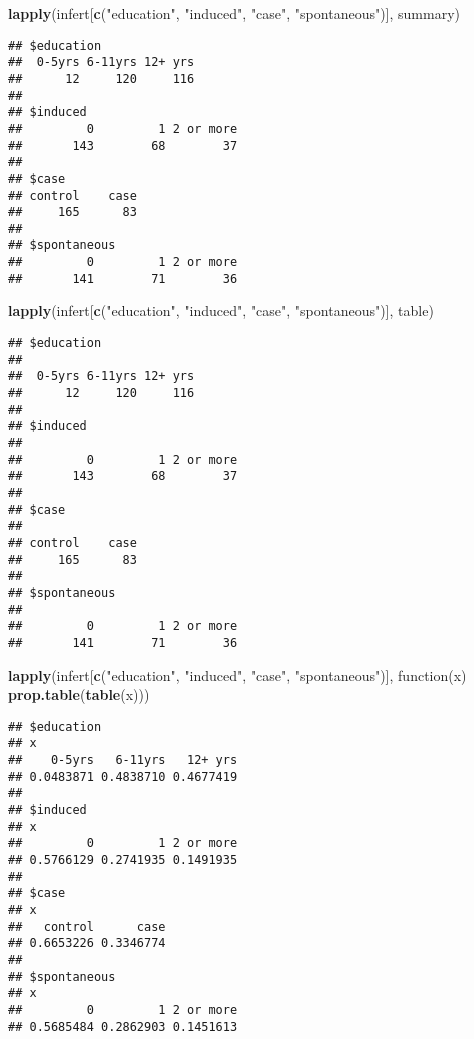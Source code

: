 \documentclass[]{book}
\newenvironment{Shaded}{\begin{snugshade}}{\end{snugshade}}
\newcommand{\KeywordTok}[1]{\textcolor[rgb]{0.13,0.29,0.53}{\textbf{{#1}}}}
\newcommand{\StringTok}[1]{\textcolor[rgb]{0.31,0.60,0.02}{{#1}}}
\newcommand{\NormalTok}[1]{{#1}}
\theoremstyle{definition}
\theoremstyle{definition}
\theoremstyle{remark}
\begin{document}
\begin{Shaded}
\begin{Highlighting}[]
\KeywordTok{lapply}\NormalTok{(infert[}\KeywordTok{c}\NormalTok{(}\StringTok{"education"}\NormalTok{, }\StringTok{"induced"}\NormalTok{, }\StringTok{"case"}\NormalTok{, }\StringTok{"spontaneous"}\NormalTok{)], summary)}
\end{Highlighting}
\end{Shaded}

\begin{verbatim}
## $education
##  0-5yrs 6-11yrs 12+ yrs 
##      12     120     116 
## 
## $induced
##         0         1 2 or more 
##       143        68        37 
## 
## $case
## control    case 
##     165      83 
## 
## $spontaneous
##         0         1 2 or more 
##       141        71        36
\end{verbatim}

\begin{Shaded}
\begin{Highlighting}[]
\KeywordTok{lapply}\NormalTok{(infert[}\KeywordTok{c}\NormalTok{(}\StringTok{"education"}\NormalTok{, }\StringTok{"induced"}\NormalTok{, }\StringTok{"case"}\NormalTok{, }\StringTok{"spontaneous"}\NormalTok{)], table)}
\end{Highlighting}
\end{Shaded}

\begin{verbatim}
## $education
## 
##  0-5yrs 6-11yrs 12+ yrs 
##      12     120     116 
## 
## $induced
## 
##         0         1 2 or more 
##       143        68        37 
## 
## $case
## 
## control    case 
##     165      83 
## 
## $spontaneous
## 
##         0         1 2 or more 
##       141        71        36
\end{verbatim}

\begin{Shaded}
\begin{Highlighting}[]
\KeywordTok{lapply}\NormalTok{(infert[}\KeywordTok{c}\NormalTok{(}\StringTok{"education"}\NormalTok{, }\StringTok{"induced"}\NormalTok{, }\StringTok{"case"}\NormalTok{, }\StringTok{"spontaneous"}\NormalTok{)], }
       \NormalTok{function(x) }\KeywordTok{prop.table}\NormalTok{(}\KeywordTok{table}\NormalTok{(x)))}
\end{Highlighting}
\end{Shaded}

\begin{verbatim}
## $education
## x
##    0-5yrs   6-11yrs   12+ yrs 
## 0.0483871 0.4838710 0.4677419 
## 
## $induced
## x
##         0         1 2 or more 
## 0.5766129 0.2741935 0.1491935 
## 
## $case
## x
##   control      case 
## 0.6653226 0.3346774 
## 
## $spontaneous
## x
##         0         1 2 or more 
## 0.5685484 0.2862903 0.1451613
\end{verbatim}
\end{document}
